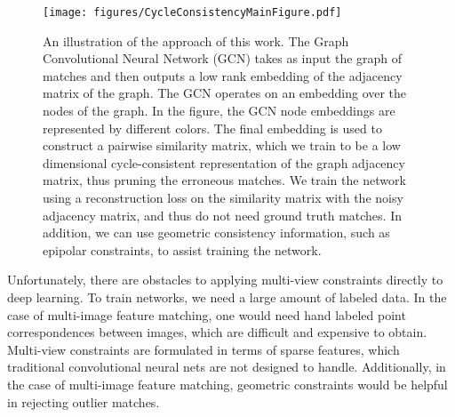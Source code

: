 \documentclass[10pt,twocolumn,letterpaper]{article}
\begin{document}
\begin{figure}[t]
\begin{center}
  \texttt{[image: figures/CycleConsistencyMainFigure.pdf]}
\end{center}
  \caption{
    An illustration of the approach of this work.
    The Graph Convolutional Neural Network (GCN) \cite{kipf2016semi} takes as input the graph of matches and then outputs a low rank embedding of the adjacency matrix of the graph.
    The GCN operates on an embedding over the nodes of the graph.
    In the figure, the GCN node embeddings are represented by different colors.
    The final embedding is used to construct a pairwise similarity matrix, which we train to be a low dimensional cycle-consistent representation of the graph adjacency matrix, thus pruning the erroneous matches.
    We train the network using a reconstruction loss on the similarity matrix with the noisy adjacency matrix, and thus do not need ground truth matches.
    In addition, we can use geometric consistency information, such as epipolar constraints, to assist training the network.
  }
\label{fig:pipeline}
\label{fig:onecol}
\end{figure}

Unfortunately, there are obstacles to applying multi-view constraints directly to deep learning. 
To train networks, we need a large amount of labeled data.
In the case of multi-image feature matching, one would need hand labeled point correspondences between images, which are difficult and expensive to obtain.
Multi-view constraints are formulated in terms of sparse features, which traditional convolutional neural nets are not designed to handle.
Additionally, in the case of multi-image feature matching, geometric constraints would be helpful in rejecting outlier matches.
\end{document}
